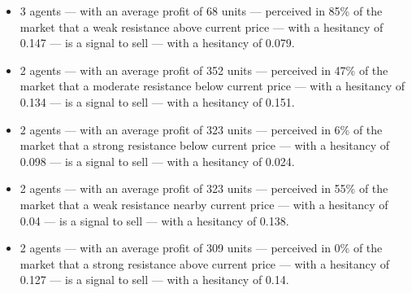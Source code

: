 {\scriptsize
\begin{itemize}
\item 3 agents — with an average profit of 68 units — perceived in 85\% of the market that a weak resistance above current price — with a hesitancy of 0.147 — is a signal to sell — with a hesitancy of 0.079.
\item 2 agents — with an average profit of 352 units — perceived in 47\% of the market that a moderate resistance below current price — with a hesitancy of 0.134 — is a signal to sell — with a hesitancy of 0.151.
\item 2 agents — with an average profit of 323 units — perceived in 6\% of the market that a strong resistance below current price — with a hesitancy of 0.098 — is a signal to sell — with a hesitancy of 0.024.
\item 2 agents — with an average profit of 323 units — perceived in 55\% of the market that a weak resistance nearby current price — with a hesitancy of 0.04 — is a signal to sell — with a hesitancy of 0.138.
\item 2 agents — with an average profit of 309 units — perceived in 0\% of the market that a strong resistance above current price — with a hesitancy of 0.127 — is a signal to sell — with a hesitancy of 0.14.
\end{itemize}
}